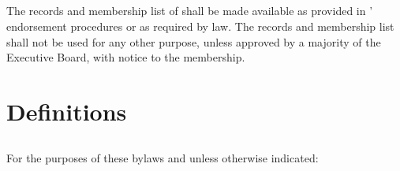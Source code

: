 \subsection{}
The records and membership list of \thedistrict{} shall be made available as provided in \thedistrict{}’ endorsement procedures or as required by law. The records and membership list shall not be used for any other purpose, unless approved by a majority of the Executive Board, with notice to the membership.

\section{Definitions} \label{defs}
\subsection{}
For the purposes of these bylaws and unless otherwise indicated:
